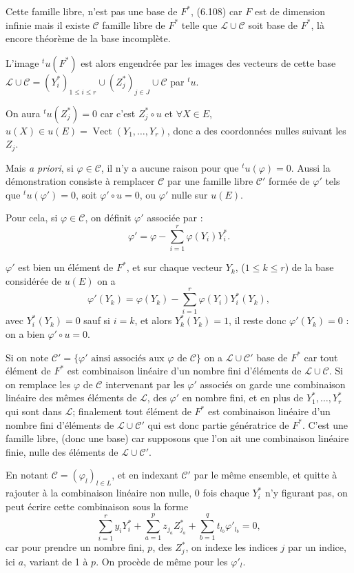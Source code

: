 Cette famille libre, n'est pas une base de $F^*$, (6.108) car $F$ est de dimension infinie mais il existe $\mathcal C$ famille libre de $F^*$ telle que $\mathcal L\cup\mathcal C$ soit base de $F^*$, là encore théorème de la base incomplète.

L'image ${}^tu(F^*)$ est alors engendrée par les images des vecteurs de cette base $\mathcal L\cup\mathcal C=(Y_i^*)_{1\le i\le r}\cup(Z_j^*)_{j\in J}\cup\mathcal C$ par ${}^tu$.

On aura ${}^tu(Z_j^*)=0$ car c'est $Z_j^*\circ u$ et $\forall X\in E$, $u(X)\in u(E)=\operatorname{Vect}(Y_1,\ldots,Y_r)$, donc a des coordonnées nulles suivant les $Z_j$.

Mais \emph{a priori}, si $\varphi\in\mathcal C$, il n'y a aucune raison pour que ${}^tu(\varphi)=0$. Aussi la démonstration consiste à remplacer $\mathcal C$ par une famille libre $\mathcal C'$ formée de $\varphi'$ tels que ${}^tu(\varphi')=0$, soit $\varphi'\circ u=0$, ou $\varphi'$ nulle sur $u(E)$.

Pour cela, si $\varphi\in\mathcal C$, on définit $\varphi'$ associée par :
\[
\varphi'=\varphi-\sum_{i=1}^r\varphi(Y_i)Y_i^*.
\]

$\varphi'$ est bien un élément de $F^*$, et sur chaque vecteur $Y_k$, ($1\le k\le r$) de la base considérée de $u(E)$ on a
\[
\varphi'(Y_k)=\varphi(Y_k)-\sum_{i=1}^r\varphi(Y_i)Y_i^*(Y_k),
\]
avec $Y_i^*(Y_k)=0$ sauf si $i=k$, et alors $Y_k^*(Y_k)=1$, il reste donc $\varphi'(Y_k)=0$ : on a bien $\varphi'\circ u=0$.

Si on note $\mathcal C'=\{\varphi'\text{ ainsi associés aux }\varphi\text{ de }\mathcal C\}$ on a $\mathcal L\cup\mathcal C'$ base de $F^*$ car tout élément de $F^*$ est combinaison linéaire d'un nombre fini d'éléments de $\mathcal L\cup\mathcal C$. Si on remplace les $\varphi$ de $\mathcal C$ intervenant par les $\varphi'$ associés on garde une combinaison linéaire des mêmes éléments de $\mathcal L$, des $\varphi'$ en nombre fini, et en plus de $Y_1^*,\ldots,Y_r^*$ qui sont dans $\mathcal L$; finalement tout élément de $F^*$ est combinaison linéaire d'un nombre fini d'éléments de $\mathcal L\cup\mathcal C'$ qui est donc partie génératrice de $F^*$. C'est une famille libre, (donc une base) car supposons que l'on ait une combinaison linéaire finie, nulle des éléments de $\mathcal L\cup\mathcal C'$.

En notant $\mathcal C=(\varphi_l)_{l\in L}$, et en indexant $\mathcal C'$ par le même ensemble, et quitte à rajouter à la combinaison linéaire non nulle, 0 fois chaque $Y_i^*$ n'y figurant pas, on peut écrire cette combinaison sous la forme
\[
\sum_{i=1}^r y_iY_i^*+\sum_{a=1}^p z_{j_a}Z_{j_a}^*+\sum_{b=1}^q t_{l_b}\varphi'_{l_b}=0,
\]
car pour prendre un nombre fini, $p$, des $Z_j^*$, on indexe les indices $j$ par un indice, ici $a$, variant de 1 à $p$. On procède de même pour les $\varphi'_l$.

